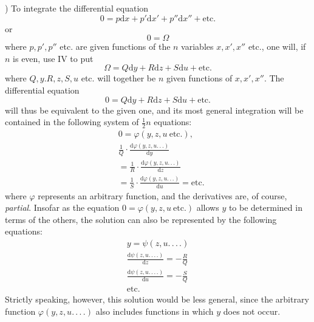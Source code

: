 ) To integrate the differential equation
\[
0=p\mathrm{d}x+p'\mathrm{d}x'+p''\mathrm{d}x''+\mathrm{etc.}
\]
or
\[
0=\Omega
\]
where $p,p',p''$ etc. are given functions of the $n$ variables $x,x',x''$ etc., one will, if $n$ is even, use IV to put
\[
\Omega=Q\mathrm{d}y+R\mathrm{d}z+S\mathrm{d}u+\mathrm{etc.}
\]
where $Q,y.R,z,S,u$ etc. will together be $n$ given functions of $x,x',x''$. The differential equation
\[
0=Q\mathrm{d}y+R\mathrm{d}z+S\mathrm{d}u+\mathrm{etc.}
\]
will thus be equivalent to the given one, and its most general integration will be contained in the following system of $\frac12 n$ equations:
\[
\begin{aligned}&0=\varphi(y,z,u\ \mathrm{etc.}),\\&
\frac1Q\cdot\frac{\mathrm{d}\varphi(y,z,u.\,.\,.)}{\mathrm{d}y}
\\&=\frac1R\cdot\frac{\mathrm{d}\varphi(y,z,u.\,.\,.)}{\mathrm{d}z}
\\&=\frac1S\cdot\frac{\mathrm{d}\varphi(y,z,u.\,.\,.)}{\mathrm{d}u}=\mathrm{etc.}\end{aligned}
\]
where $\varphi$ represents an arbitrary function, and the derivatives are, of course, \textit{partial}. Insofar as the equation
$0=\varphi(y,z,u\ \mathrm{etc.})$
allows $y$ to be determined in terms of the others, the solution can also be represented by the following equations:
\[
\begin{gathered}
y=\psi(z,u.\,.\,.\,.)\\
\frac{\mathrm{d}\psi(z,u.\,.\,.\,.)}{\mathrm{d}z}=-\frac RQ\\
\frac{\mathrm{d}\psi(z,u.\,.\,.\,.)}{\mathrm{d}u}=-\frac SQ\\
\text{etc.}
\end{gathered}
\]
Strictly speaking, however, this solution would be less general, since the arbitrary function $\varphi(y,z,u.\,.\,.\,.)$ also includes functions in which $y$ does not occur.


